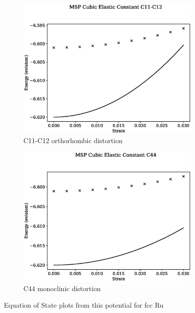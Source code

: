 \begin{figure}[htb]
\begin{subfigure}{.42\textwidth}
  \centering
  \includegraphics[width=.90\linewidth]{chapters/potentials_fe_pd_ru/feru_potential/ec_mskp/msp_c11_c12_plot_bp_2.eps}  
  \caption{C11-C12 orthorhombic distortion}
  \label{fig:feru-fefcc-c11c12}
\end{subfigure}
\begin{subfigure}{.42\textwidth}
  \centering
  \includegraphics[width=.90\linewidth]{chapters/potentials_fe_pd_ru/feru_potential/ec_mskp/msp_c44_plot_bp_2.eps}  
  \caption{C44 monoclinic distortion}
  \label{fig:feru-fefcc-c11c12c44}
\end{subfigure}
\label{fig:fig:fepd-fefcc-equation-of-state}
\caption{Equation of State plots from this potential for \acrshort{fcc} Ru}
\end{figure}



